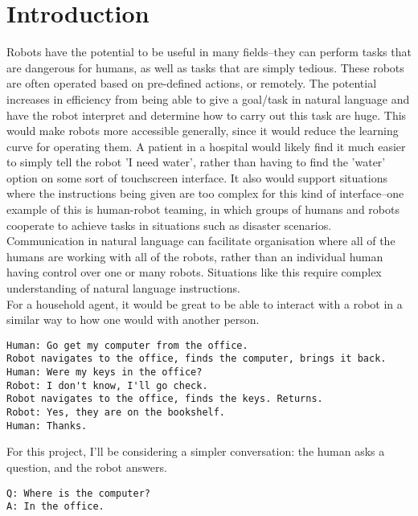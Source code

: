 \chapter{Introduction}
Robots have the potential to be useful in many fields–they can perform tasks that are dangerous for humans, as well as tasks that are simply tedious. These robots are often operated based on pre-defined actions, or remotely. The potential increases in efficiency from being able to give a goal/task in natural language and have the robot interpret and determine how to carry out this task are huge. This would make robots more accessible generally, since it would reduce the learning curve for operating them. A patient in a hospital would likely find it much easier to simply tell the robot 'I need water', rather than having to find the 'water' option on some sort of touchscreen interface. It also would support situations where the instructions being given are too complex for this kind of interface--one example of this is human-robot teaming, in which groups of humans and robots cooperate to achieve tasks in situations such as disaster scenarios\cite{Kruijff-Korbayova:2015aa}. Communication in natural language can facilitate organisation where all of the humans are working with all of the robots, rather than an individual human having control over one or many robots. Situations like this require complex understanding of natural language instructions. \\
For a household agent, it would be great to be able to interact with a robot in a similar way to how one would with another person. 
\begin{verbatim}
Human: Go get my computer from the office. 
Robot navigates to the office, finds the computer, brings it back. 
Human: Were my keys in the office?
Robot: I don't know, I'll go check. 
Robot navigates to the office, finds the keys. Returns.
Robot: Yes, they are on the bookshelf. 
Human: Thanks. 
\end{verbatim}
For this project, I'll be considering a simpler conversation: the human asks a question, and the robot answers. %
\begin{verbatim}
Q: Where is the computer?
A: In the office. 
\end{verbatim}


